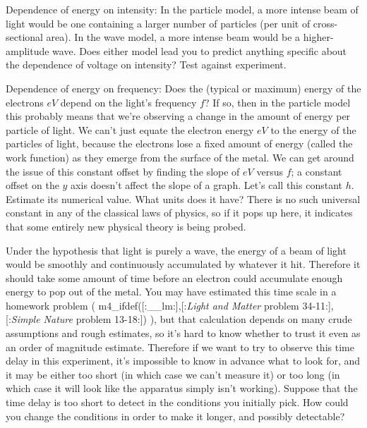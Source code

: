 Dependence of energy on intensity: In the particle model, a more intense beam of light would be
one containing a larger number of particles (per unit of cross-sectional area). In the wave model,
a more intense beam would be a higher-amplitude wave. Does either model lead you to predict anything
specific about the dependence of voltage on intensity? Test against experiment. 

Dependence of energy on frequency: Does the (typical or maximum) energy of the electrons $eV$
depend on the light's frequency $f$? If so, then in the particle model this probably means that
we're observing a change in the amount of energy per particle of light. We can't just equate the electron energy $eV$
to the energy of the particles of light, because the electrons lose a fixed amount of energy (called the
work function) as they emerge from the surface of the metal. We can get around the issue of this constant
offset by finding the slope of $eV$ versus $f$; a constant offset on the $y$ axis doesn't affect the slope
of a graph. Let's call this constant $h$. Estimate its numerical value. What units does it have?
There is no such universal constant in any of the classical laws of physics, so if it pops up here,
it indicates that some entirely new physical theory is being probed.

\prelab

\prelabquestion Under the hypothesis that light is purely a wave, the energy of a beam of
light would be smoothly and continuously accumulated by whatever it hit. Therefore it should
take some amount of time before an electron could accumulate enough energy to pop out of the metal.
You may have estimated this time scale in a homework problem
(%
m4_ifdef([:__lm:],[:\emph{Light and Matter} problem 34-11:],[:\emph{Simple Nature} problem 13-18:])%
),
 but that calculation depends on many crude assumptions and rough
estimates, so it's hard to know whether to trust it even as an order of magnitude estimate.
Therefore if we want to try to observe this time delay in this experiment, it's impossible to
know in advance what to look for, and it may be either too short (in which case we can't measure
it) or too long (in which case it will look like the apparatus simply isn't working). Suppose
that the time delay is too short to detect in the conditions you initially pick. How could
you change the conditions in order to make it longer, and possibly detectable?

